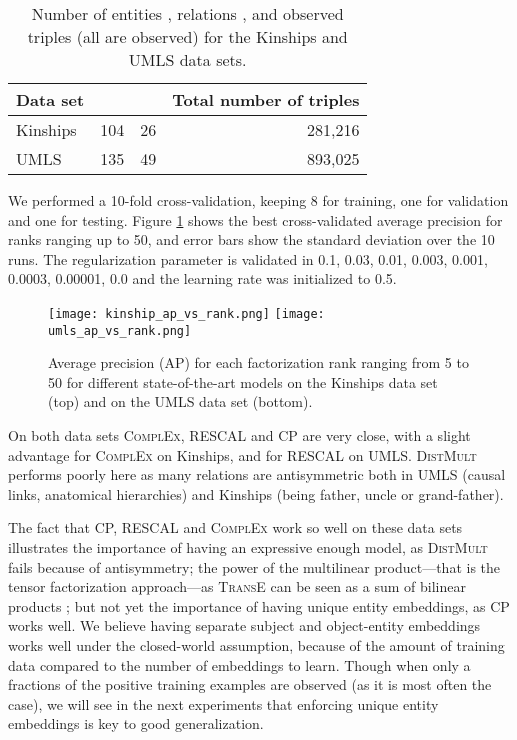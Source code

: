 \documentclass[twoside,11pt]{article}
\renewcommand{\cite}{\citep}
\begin{document}
\begin{table}[ht]
    \centering
    \begin{tabular}{l|rrr}
        Data set &  &  & Total number of triples\\ \hline
        Kinships & 104 & 26 & 281,216 \\
        UMLS & 135 & 49 & 893,025 \\
    \end{tabular}
    \caption{Number of entities , relations , and observed triples (all are observed) for the Kinships and UMLS data sets.}
    \label{tab:kinship_and_umls_meta}
\end{table}


We performed a 10-fold cross-validation, keeping 8 for training, one for validation and one for testing.
Figure \ref{fig:exp_kinships_umls} shows the best cross-validated average precision for ranks ranging up to 50, and error bars show the standard deviation over the 10 runs.
The regularization parameter  is validated in 0.1, 0.03, 0.01, 0.003, 0.001, 0.0003, 0.00001, 0.0 and the learning rate  was initialized to 0.5.



\begin{figure}[t]
	\centering
	\texttt{[image: kinship\_ap\_vs\_rank.png]}
	\texttt{[image: umls\_ap\_vs\_rank.png]} 
\caption{Average precision (AP) for each factorization rank ranging from 5 to 50 for different state-of-the-art models on the Kinships data set (top) and on the UMLS data set (bottom).}
	\label{fig:exp_kinships_umls}
\end{figure}

On both data sets \textsc{ComplEx}, RESCAL and CP are very close, with a slight advantage for \textsc{ComplEx} on Kinships, and for RESCAL on UMLS. 
\textsc{DistMult} performs poorly here as many relations are antisymmetric
both in UMLS (causal links, anatomical hierarchies)
and Kinships (being father, uncle or grand-father). 

The fact that CP, RESCAL and \textsc{ComplEx} 
work so well on these data sets illustrates
the importance of having an expressive enough model,
as \textsc{DistMult} fails because of \mbox{antisymmetry}; 
the power of the multilinear product---that is the
tensor factorization approach---as \textsc{TransE} can be 
seen as a sum of bilinear products 
\cite{garcia2016combining}; but not yet the importance
of having unique entity embeddings, as CP works well. 
We believe having separate subject and object-entity embeddings
works well under the closed-world assumption, because of the
amount of training data compared to the number of embeddings
to learn.
Though when only a fractions of the positive training
examples are observed (as it is most often the case),
we will see in the next experiments 
that enforcing unique entity
embeddings is key to good generalization.
\end{document}
